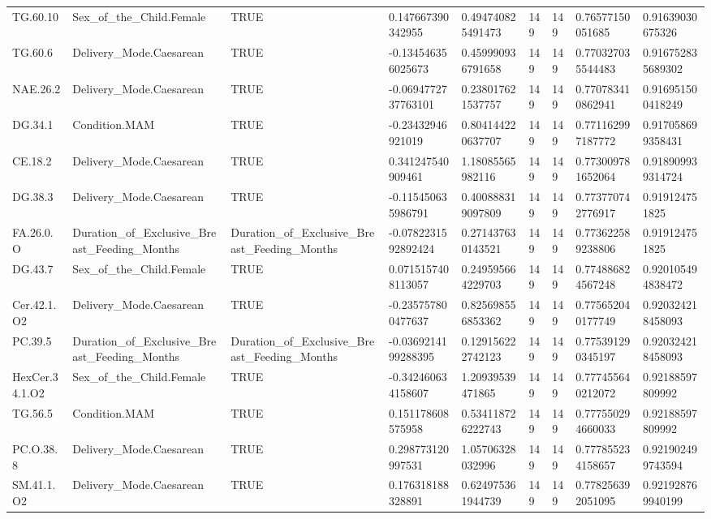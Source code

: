 \begin{longtable}{lllllllll}
TG.60.10 & Sex\_of\_the\_Child.Female & TRUE & 0.147667390342955 & 0.494740825491473 & 149 & 149 & 0.76577150051685 & 0.91639030675326 \\
TG.60.6 & Delivery\_Mode.Caesarean & TRUE & -0.134546356025673 & 0.459990936791658 & 149 & 149 & 0.770327035544483 & 0.916752835689302 \\
NAE.26.2 & Delivery\_Mode.Caesarean & TRUE & -0.0694772737763101 & 0.238017621537757 & 149 & 149 & 0.770783410862941 & 0.916951500418249 \\
DG.34.1 & Condition.MAM & TRUE & -0.23432946921019 & 0.804144220637707 & 149 & 149 & 0.771162997187772 & 0.917058699358431 \\
CE.18.2 & Delivery\_Mode.Caesarean & TRUE & 0.341247540909461 & 1.18085565982116 & 149 & 149 & 0.773009781652064 & 0.918909939314724 \\
DG.38.3 & Delivery\_Mode.Caesarean & TRUE & -0.115450635986791 & 0.400888319097809 & 149 & 149 & 0.773770742776917 & 0.919124751825 \\
FA.26.0.O & Duration\_of\_Exclusive\_Breast\_Feeding\_Months & Duration\_of\_Exclusive\_Breast\_Feeding\_Months & -0.0782231592892424 & 0.271437630143521 & 149 & 149 & 0.773622589238806 & 0.919124751825 \\
DG.43.7 & Sex\_of\_the\_Child.Female & TRUE & 0.0715157408113057 & 0.249595664229703 & 149 & 149 & 0.774886824567248 & 0.920105494838472 \\
Cer.42.1.O2 & Delivery\_Mode.Caesarean & TRUE & -0.235757800477637 & 0.825698556853362 & 149 & 149 & 0.775652040177749 & 0.920324218458093 \\
PC.39.5 & Duration\_of\_Exclusive\_Breast\_Feeding\_Months & Duration\_of\_Exclusive\_Breast\_Feeding\_Months & -0.0369214199288395 & 0.129156222742123 & 149 & 149 & 0.775391290345197 & 0.920324218458093 \\
HexCer.34.1.O2 & Sex\_of\_the\_Child.Female & TRUE & -0.342460634158607 & 1.20939539471865 & 149 & 149 & 0.777455640212072 & 0.92188597809992 \\
TG.56.5 & Condition.MAM & TRUE & 0.151178608575958 & 0.534118726222743 & 149 & 149 & 0.777550294660033 & 0.92188597809992 \\
PC.O.38.8 & Delivery\_Mode.Caesarean & TRUE & 0.298773120997531 & 1.05706328032996 & 149 & 149 & 0.777855234158657 & 0.921902499743594 \\
SM.41.1.O2 & Delivery\_Mode.Caesarean & TRUE & 0.176318188328891 & 0.624975361944739 & 149 & 149 & 0.778256392051095 & 0.921928769940199 \\

\end{longtable}

